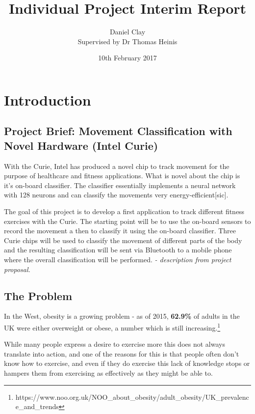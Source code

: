 \documentclass[a4paper]{article}
\begin{document}
\title{Individual Project Interim Report}
\date{10th February 2017}
\author{
Daniel Clay \\
Supervised by Dr Thomas Heinis
}
\maketitle

\newpage
\section{Introduction}

\subsection{Project Brief: Movement Classification with Novel Hardware (Intel Curie)}

With the Curie, Intel has produced a novel chip to track movement for the purpose of healthcare and fitness applications. What is novel about the chip is it's on-board classifier. The classifier essentially implements a neural network with 128 neurons and can classify the movements very energy-efficient[sic].

The goal of this project is to develop a first application to track different fitness exercises with the Curie. The starting point will be to use the on-board sensors to record the movement a then to classify it using the on-board classifier. Three Curie chips will be used to classify the movement of different parts of the body and the resulting classification will be sent via Bluetooth to a mobile phone where the overall classification will be performed. \textit{- description from project proposal.}

\subsection{The Problem}%

In the West, obesity is a growing problem - as of 2015, \textbf{62.9\%} of adults in the UK were either overweight or obese, a number which is still increasing.\footnote{https://www.noo.org.uk/NOO_about_obesity/adult_obesity/UK_prevalence_and_trends}

While many people express a desire to exercise more this does not always translate into action, and one of the reasons for this is that
people often don't know how to exercise, and even if they do exercise this lack of knowledge stops or hampers them from exercising as effectively as they might be able to.
\end{document}
